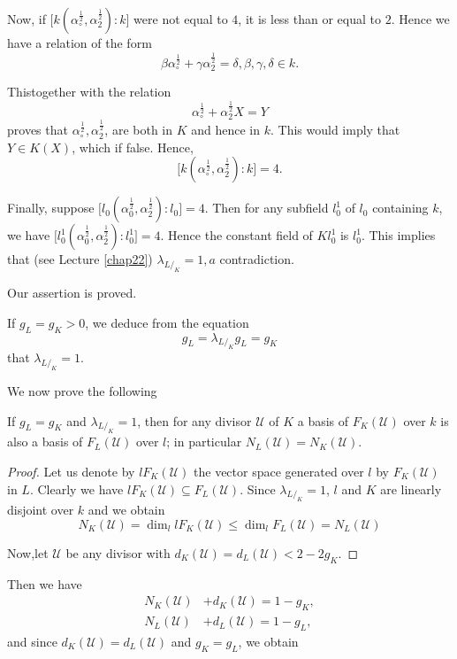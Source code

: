 Now, if $\bigg[ k \left(\alpha^{\frac{1}{2}}_{\circ},
  \alpha^{\frac{1}{2}}_{2}\right) : k \bigg]$ were not equal to $4$, it is
less than or equal to $2$. Hence we have a relation of the form 
$$
\beta \alpha^{\frac{1}{2}}_{\circ} + \gamma \alpha^{\frac{1}{2}}_{2}
= \delta, \beta, \gamma, \delta \in k. 
$$

This\pageoriginale together with the relation
$$
\alpha^{\frac{1}{2}}_{\circ} + \alpha^{\frac{1}{2}}_{2} X = Y
$$
proves that $\alpha^{\frac{1}{2}}_{\circ},
\alpha^{\frac{1}{2}}_{2}$, are both in $K$ and hence in $k$. This
would imply that $Y \in K (X)$, which if false. Hence, 
$$
\bigg[ k \left(\alpha^{\frac{1}{2}}_{\circ},
  \alpha^{\frac{1}{2}}_{2}\right) : k \bigg ] = 4. 
$$ 

Finally, suppose $\bigg[l_0 \left(\alpha^{\frac{1}{2}}_0,
  \alpha^{\frac{1}{2}}_{2}\right) : l_0 \bigg] = 4$. Then for any
subfield $l^1_0$ of $l_0$ containing $k$, we have $\bigg[
  l^1_0 \left(\alpha^{\frac{1}{2}}_0, \alpha^{\frac{1}{2}}_{2}\right)
  : l^1_0 \bigg ] = 4$. Hence the constant field of $Kl^1_0$
is $l^1_0$. This implies that (see Lecture \ref{chap22})
$\lambda_{L/_K}=1, a$ contradiction. 

Our assertion is proved.

If $g_L = g_K > 0$, we deduce from the equation
$$
g_L = \lambda_{L/_K} g_L = g_K
$$
that $\lambda_{L/_K} = 1$.

We now prove the following
\begin{theorem*}
  If $g_L = g_K$ and $\lambda_{L/_K}=1$, then for any divisor
  $\mathscr{U}$ of $K$ a basis of $F_K(\mathscr{U})$ over $k$ is also
  a basis of $F_L(\mathscr{U})$ over $l$; in particular
  $N_L(\mathscr{U}) = N_K(\mathscr{U})$. 
\end{theorem*}

\begin{proof}
  Let us denote by $l F_K(\mathscr{U})$ the vector space generated over
  $l$ by $F_K(\mathscr{U})$ in $L$. Clearly we have $lF_K(\mathscr{U})
  \subseteq F_L(\mathscr{U})$. Since $\lambda_{L/_K} = 1$, $l$ and $K$
  are linearly disjoint over $k$ and we obtain 
  $$
  N_K (\mathscr{U}) = \dim_l lF_K(\mathscr{U}) \leq \dim_l F_L
  (\mathscr{U}) = N_L(\mathscr{U}) 
  $$

  Now,\pageoriginale let $\mathscr{U}$ be any divisor with $d_K(\mathscr{U}) =
  d_L(\mathscr{U}) < 2 - 2g_K$. 
\end{proof}

Then we have
\begin{align*}
  N_K(\mathscr{U}) & + d_K(\mathscr{U}) = 1-g_K ,\\
  N_L(\mathscr{U}) & + d_L(\mathscr{U}) = 1-g_L,
\end{align*}
and since $d_K(\mathscr{U}) = d_L(\mathscr{U})$ and $g_K = g_L$, we obtain

